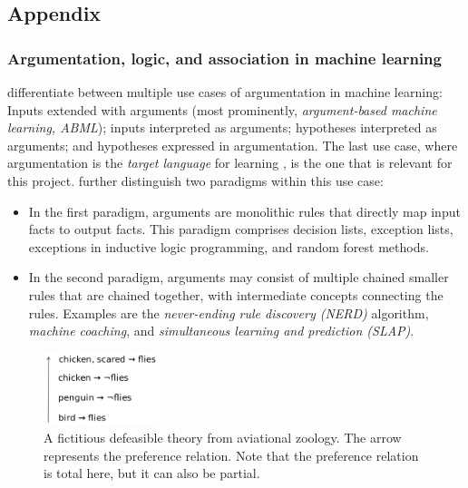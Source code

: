 \subsection{Appendix}\label{without}
\subsubsection{Argumentation, logic, and association in machine learning}

\citet{kakasAbductionArgumentationExplainable2020} differentiate between multiple use cases of argumentation in machine learning: Inputs extended with arguments (most prominently, \textit{argument-based machine learning, ABML}); inputs interpreted as arguments; hypotheses interpreted as arguments; and hypotheses expressed in argumentation. The last use case, where argumentation is the \textit{target language} for learning \citep[p.~17]{kakasAbductionArgumentationExplainable2020}, is the one that is relevant for this project. \citet{kakasAbductionArgumentationExplainable2020} further distinguish two paradigms within this use case: 

\begin{itemize}
    \item In the first paradigm, arguments are monolithic rules that directly map input facts to output facts. This paradigm comprises decision lists, exception lists, exceptions in inductive logic programming, and random forest methods.
    \item In the second paradigm, arguments may consist of multiple chained smaller rules that are chained together, with intermediate concepts connecting the rules. Examples are the \textit{never-ending rule discovery (NERD)} algorithm, \textit{machine coaching}, and \textit{simultaneous learning and prediction (SLAP)}. 
\end{itemize}

\label{sec:defeasible-rules}

\begin{figure}[htb]
        \centering
        \includegraphics[width=0.3\textwidth]{images/defeasible-theory.png}
        \caption{A fictitious defeasible theory from aviational zoology. The arrow represents the preference relation. Note that the preference relation is total here, but it can also be partial.}
        \label{fig:defeasible-rules}
\end{figure}

